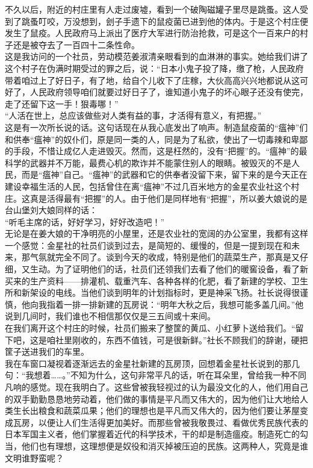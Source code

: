 不久以后，附近的村庄里有人走过废墟，看到一个破陶磁罐子里尽是跳蚤。这人受到了跳蚤叮咬，万没想到，刽子手遗下的鼠疫菌已进到他的体内。于是这个村庄便发生了鼠疫。人民政府马上派出了医疗大军进行防治抢救，可是这个一百来户的村子还是被夺去了一百四十二条性命。\\

这是我访问的一个社员，劳动模范姜淑清亲眼看到的血淋淋的事实。她给我们讲了这个村子在伪满时期受过的罪之后，说：“日本小鬼子投了降，缴了枪，人民政府带着咱过上了好日子，有了地，给自个儿收下了庄稼，大伙高高兴兴地都说从这可好了，人民政府领导咱们就要过好日子了，谁知道小鬼子的坏心眼子还没有使完，走了还留下这一手！狠毒哪！”\\

“人活在世上，总应该做些对人类有益的事，才活得有意义，有把握。”\\

这是有一次所长说的话。这句话现在从我心底发出了响声。制造鼠疫菌的“瘟神”们和供奉“瘟神”的奴仆们，原是同一类的人，同是为了私欲，使出了一切毒辣和卑鄙的手段，不惜让成亿人走进毁灭。然而，这是枉然的，没有“把握”的。“瘟神”的最科学的武器并不万能，最费心机的欺诈并不能蒙住别人的眼睛。被毁灭的不是人民，而是“瘟神”自己。“瘟神”的武器和它的供奉者没留下来，留下来的是今天正在建设幸福生活的人民，包括曾住在离“瘟神”不过几百米地方的金星农业社这个村庄。这真是活得最有“把握”的人。由于他们是同样地有“把握”，所以姜大娘说的是台山堡刘大娘同样的话：\\

“听毛主席的话，好好学习，好好改造吧！”\\

无论是在姜大娘的干净明亮的小屋里，还是农业社的宽阔的办公室里，我都有这样一个感觉：金星社的社员们谈到过去，是简短的、缓慢的，但是一提到现在和未来，那气氛就完全不同了。谈到今天的收成，特别是他们的蔬菜生产，那真是又仔细，又生动。为了证明他们的话，社员们还领我们去看了他们的暖窖设备，看了新买来的生产资料——排灌机、载重汽车、各种各样的化肥，看了新建的学校、卫生所和新架设的电线。当他们谈到明年的计划指标时，更是神采飞扬。社长说得很谨慎，他向我指着一排一排新建的瓦房说：“明年大秋之后，我想可能多盖几间。”他说到几间时，我们谁也不相信那仅仅是三五间或十来间。\\

在我们离开这个村庄的时候，社员们搬来了整筐的黄瓜、小红萝卜送给我们。“留下吧，这是咱社里刚收的，东西不值钱，可是很新鲜。”社长不顾我们的辞谢，硬把筐子送进我们的车里。\\

我在车窗口凝视着逐渐远去的金星社新建的瓦房顶，回想着金星社长说到的那几句：“我想着……。”不知为什么，这句非常平凡的话，听在耳朵里，曾给我一种不同凡响的感觉。现在我明白了。这些曾被我轻视过的认为最没文化的人，他们用自己的双手勤勤恳恳地劳动着，他们做的事情是平凡而又伟大的，因为他们让大地给人类生长出粮食和蔬菜瓜果；他们的理想也是平凡而又伟大的，因为他们要让茅屋变成瓦房，以便让人们生活得更加美好。而那些曾被我敬畏过、看做优秀民族代表的日本军国主义者，他们掌握着近代的科学技术，干的却是制造瘟疫。制造死亡的勾当，他们也有理想，这理想便是奴役和消灭掉被压迫的民族。这两种人，究竟是谁文明谁野蛮呢？\\

